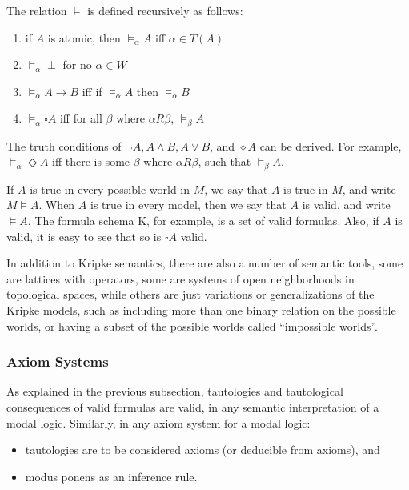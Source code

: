 \documentclass[12pt]{article}
\begin{document}
The relation $\models$ is defined recursively as follows:
\begin{multicols}{2}{
\begin{enumerate}
\item if $A$ is atomic, then $\models_{\alpha} A$ iff $\alpha \in T(A)$
\item $\models_{\alpha} \perp$ for no $\alpha \in W$
\item $\models_{\alpha} A \to B$ iff if $\models_{\alpha} A$ then $\models_{\alpha} B$
\item $\models_{\alpha} \square A$ iff for all $\beta$ where $\alpha R \beta$, $\models_{\beta} A$
\end{enumerate}}
\end{multicols}
The truth conditions of $\neg A, A\land B, A\lor B$, and $\diamond A$ can be derived.  For example, $\models_{\alpha} \Diamond A$ iff there is some $\beta$ where $\alpha R \beta$, such that $\models_{\beta} A$.

If $A$ is true in every possible world in $M$, we say that $A$ is true in $M$, and write $M \models A$.  When $A$ is true in every model, then we say that $A$ is valid, and write $\models A$.  The formula schema K, for example, is a set of valid formulas.  Also, if $A$ is valid, it is easy to see that so is $\square A$ valid.

In addition to Kripke semantics, there are also a number of semantic tools, some are lattices with operators, some are systems of open neighborhoods in topological spaces, while others are just variations or generalizations of the Kripke models, such as including more than one binary relation on the possible worlds, or having a subset of the possible worlds called ``impossible worlds''.

\subsubsection*{Axiom Systems}

As explained in the previous subsection, tautologies and tautological consequences of valid formulas are valid, in any semantic interpretation of a modal logic.  Similarly, in any axiom system for a modal logic:
\begin{itemize}
\item tautologies are to be considered axioms (or deducible from axioms), and 
\item modus ponens as an inference rule.
\end{itemize}
\end{document}
